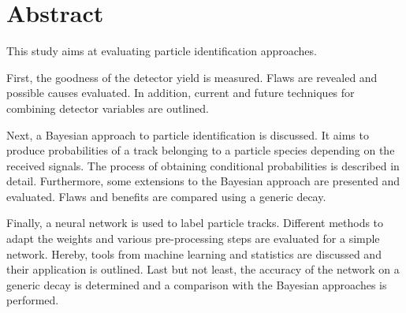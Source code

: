 \chapter*{Abstract}

This study aims at evaluating particle identification approaches.

First, the goodness of the detector yield is measured. Flaws are revealed and possible causes evaluated. In addition, current and future techniques for combining detector variables are outlined.

Next, a Bayesian approach to particle identification is discussed. It aims to produce probabilities of a track belonging to a particle species depending on the received signals. The process of obtaining conditional probabilities is described in detail. Furthermore, some extensions to the Bayesian approach are presented and evaluated. Flaws and benefits are compared using a generic decay.

Finally, a neural network is used to label particle tracks. Different methods to adapt the weights and various pre-processing steps are evaluated for a simple network. Hereby, tools from machine learning and statistics are discussed and their application is outlined. Last but not least, the accuracy of the network on a generic decay is determined and a comparison with the Bayesian approaches is performed.
